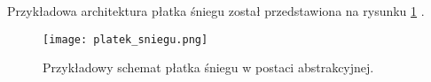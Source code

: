 Przykładowa architektura płatka śniegu został przedstawiona na rysunku \ref{fig:platek_sniegu} .

\begin{center}
\begin{figure}[H]
  \begin{center}
    \texttt{[image: platek\_sniegu.png]}
  \end{center}
  \caption{Przykładowy schemat płatka śniegu w postaci abstrakcyjnej. }
    \label{fig:platek_sniegu}
\end{figure}
\end{center}







\begin{comment}
 
\end{comment}
